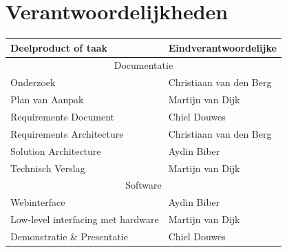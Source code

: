 \section{Verantwoordelijkheden}
\begin{tabular}{ p{5cm} | l }
\textbf{Deelproduct of taak} & \textbf{Eindverantwoordelijke}\\
\hline
\multicolumn{2}{c}{Documentatie}\\
\hline
Onderzoek & Christiaan van den Berg \\
Plan van Aanpak & Martijn van Dijk \\
Requirements Document & Chiel Douwes \\
Requirements Architecture & Christiaan van den Berg \\
Solution Architecture & Aydin Biber \\
Technisch Verslag & Martijn van Dijk \\
\hline
\multicolumn{2}{c}{Software}\\
\hline
Webinterface & Aydin Biber\\
Low-level interfacing met hardware & Martijn van Dijk\\
Demonstratie \& Presentatie & Chiel Douwes \\
\end{tabular}